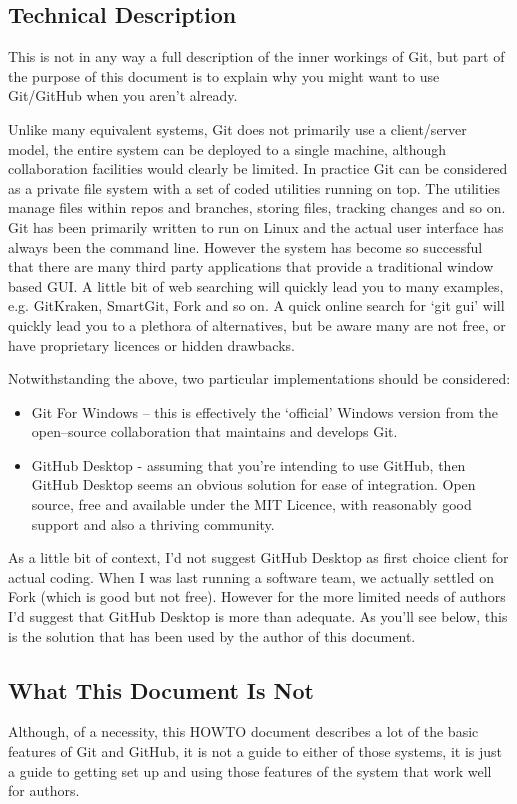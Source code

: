\documentclass[a4paper, 12pt]{article}
\begin{document}
\subsection{Technical Description}
This is not in any way a full description of the inner workings of Git, but part of the purpose of this document is to explain why you might want to use Git/GitHub when you aren't already.

Unlike many equivalent systems, Git does not primarily use a client/server model, the entire system can be deployed to a single machine, although collaboration facilities would clearly be limited. In practice Git can be considered as a private file system with a set of coded utilities running on top. The utilities manage files within repos and branches, storing files, tracking changes and so on. Git has been primarily written to run on Linux and the actual user interface has always been the command line. However the system has become so successful that there are many third party applications that provide a traditional window based GUI. A little bit of web searching will quickly lead you to many examples, e.g. GitKraken, SmartGit, Fork and so on. A quick online search for `git gui' will quickly lead you to a plethora of alternatives, but be aware many are not free, or have proprietary licences or hidden drawbacks.

Notwithstanding the above, two particular implementations should be considered:
\begin{itemize}
\item Git For Windows -- this is effectively the `official' Windows version from the open--source collaboration that maintains and develops Git.
\item GitHub Desktop - assuming that you're intending to use GitHub, then GitHub Desktop seems an obvious solution for ease of integration. Open source, free and available under the MIT Licence, with reasonably good support and also a thriving community.
\end{itemize}
As a little bit of context, I'd not suggest GitHub Desktop as first choice client for actual coding. When I was last running a software team, we actually settled on Fork (which is good but not free). However for the more limited needs of authors I'd suggest that GitHub Desktop is more than adequate. As you'll see below, this is the solution that has been used by the author of this document.

\subsection{What This Document Is Not}
Although, of a necessity, this HOWTO document describes a lot of the basic features of Git and GitHub, it is not a guide to either of those systems, it is just a guide to getting set up and using those features of the system that work well for authors.
\end{document}
